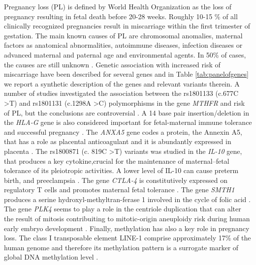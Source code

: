 \documentclass[10pt,letterpaper]{article}
\begin{document}
Pregnancy loss (PL) is defined by World Health Organization as the loss of pregnancy resulting in fetal death before 20-28 weeks. Roughly 10-15 \% of all clinically recognized pregnancies result in miscarriage within the first trimester of gestation. The main known causes of PL are chromosomal anomalies, maternal factors as anatomical abnormalities, autoimmune diseases, infection diseases or advanced maternal and paternal age and environmental agents. In 50\% of cases, the causes are still unknown \cite{campana2017association, du2019polymorphisms, sudhir2016cytogenetic, oliver2014diagnosis, yakut2015chromosome}. 
\noindent Genetic association with increased risk of miscarriage have been described for several genes and in Table \ref{tab:panelofgenes} we report a synthetic description of the genes and relevant variants therein. A number of studies investigated the association between the rs1801133 (c.677C \textgreater T) and rs1801131 (c.1298A \textgreater C) polymorphisms in the gene \textit{MTHFR} and risk of PL, but the conclusions are controversial \cite{kim2006influence, biswas2008recurrent, foka2000factor}. A 14 base pair insertion/deletion in the \textit{HLA-G} gene is also considered important for fetal-maternal immune tolerance and successful pregnancy \cite{nowak2016possible, arjmand2016balance}. The \textit{ANXA5} gene codes a protein, the Annexin A5, that has a role as placental anticoagulant and it is abundantly expressed in placenta \cite{hayashi2013genotyping, zhang2017association}. The rs1800871 (c. 819C \textgreater T)  variants was studied in the \textit{IL-10} gene, that produces a key cytokine,crucial for the maintenance of maternal–fetal tolerance of its pleiotropic activities. A lower level of IL-10 can cause preterm birth, and preeclampsia \cite{su2016association,cochery2009interleukin,qaddourah201410, gu2016association}. The gene \textit{CTLA-4} is constitutively expressed on regulatory T cells and promotes maternal fetal tolerance \cite{zhang2018synergic, misra2016association}. The gene \textit{SMTH1} produces a serine hydroxyl-methyltran-ferase 1 involved in the cycle of folic acid \cite{coppede2015genetics, boyles2006neural,mckay2012genetic}. The gene \textit{PLK4} seems to play a role in the centriole duplication that can alter the result of mitosis contribuiting to mitotic-origin aneuploidy risk during human early embryo development \cite{mccoy2015common, zhang2017association}.
\noindent Finally, methylation has also a key role in pregnancy loss. The class I transposable element LINE-1 comprise approximately 17\% of the human genome \cite{lander2001initial} and therefore its methylation pattern is a surrogate marker of global DNA methylation level \cite{perrin2007specific}.
\end{document}
